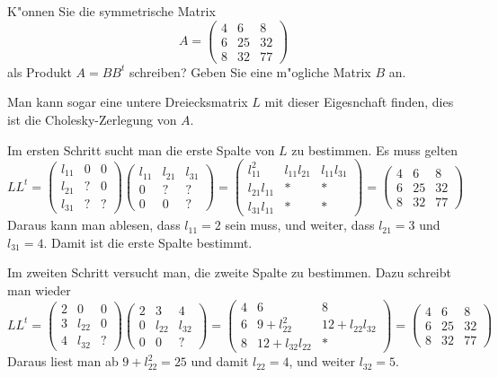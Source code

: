 K"onnen Sie die symmetrische Matrix
\[
A=\begin{pmatrix}
 4& 6& 8\\
 6&25&32\\
 8&32&77
\end{pmatrix}
\]
als Produkt $A=BB^t$ schreiben? Geben Sie eine m"ogliche Matrix $B$ an.

\begin{loesung}
Man kann sogar eine untere Dreiecksmatrix $L$ mit dieser Eigesnchaft finden,
dies ist die Cholesky-Zerlegung von $A$.

Im ersten Schritt sucht man die erste Spalte von $L$ zu bestimmen.
Es muss gelten
\[
LL^t=
\begin{pmatrix}
l_{11}&  0&  0\\
l_{21}&  ?&  0\\
l_{31}&  ?&  ?
\end{pmatrix}
\begin{pmatrix}
l_{11}&l_{21}&l_{31}\\
     0&     ?&     ?\\
     0&     0&     ?
\end{pmatrix}
=
\begin{pmatrix}
    l_{11}^2&l_{11}l_{21}&l_{11}l_{31}\\
l_{21}l_{11}&           *&           *\\
l_{31}l_{11}&           *&           *
\end{pmatrix}
=
\begin{pmatrix}
 4& 6& 8\\
 6&25&32\\
 8&32&77
\end{pmatrix}
\]
Daraus kann man ablesen, dass $l_{11}=2$ sein muss, und weiter,
dass
$l_{21}=3$ und $l_{31}=4$. Damit ist die erste Spalte bestimmt.

Im zweiten Schritt versucht man, die zweite Spalte zu bestimmen.
Dazu schreibt man wieder
\[
LL^t
=
\begin{pmatrix}
2&     0&0\\
3&l_{22}&0\\
4&l_{32}&?
\end{pmatrix}
\begin{pmatrix}
2&     3&     4\\
0&l_{22}&l_{32}\\
0&     0&?
\end{pmatrix}
=
\begin{pmatrix}
 4&              6&             8\\
 6& 9+l_{22}^2    &12+l_{22}l_{32}\\
 8&12+l_{32}l_{22}&             *
\end{pmatrix}
=
\begin{pmatrix}
 4& 6& 8\\
 6&25&32\\
 8&32&77
\end{pmatrix}
\]
Daraus liest man ab $9+l_{22}^2=25$ und damit $l_{22}=4$, und weiter
$l_{32}=5$.


\end{loesung}
